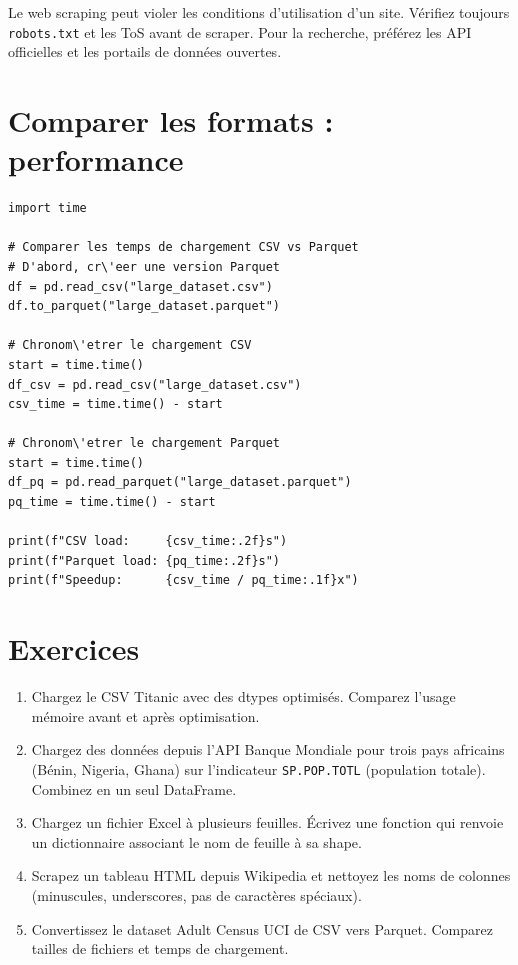 \begin{warningbox}
Le web scraping peut violer les conditions d'utilisation d'un site. V\'erifiez toujours \texttt{robots.txt} et les ToS avant de scraper. Pour la recherche, pr\'ef\'erez les API officielles et les portails de donn\'ees ouvertes.
\end{warningbox}

\section{Comparer les formats : performance}

\begin{verbatim}
import time

# Comparer les temps de chargement CSV vs Parquet
# D'abord, cr\'eer une version Parquet
df = pd.read_csv("large_dataset.csv")
df.to_parquet("large_dataset.parquet")

# Chronom\'etrer le chargement CSV
start = time.time()
df_csv = pd.read_csv("large_dataset.csv")
csv_time = time.time() - start

# Chronom\'etrer le chargement Parquet
start = time.time()
df_pq = pd.read_parquet("large_dataset.parquet")
pq_time = time.time() - start

print(f"CSV load:     {csv_time:.2f}s")
print(f"Parquet load: {pq_time:.2f}s")
print(f"Speedup:      {csv_time / pq_time:.1f}x")
\end{verbatim}

\section{Exercices}

\begin{exercise}
\begin{enumerate}
  \item Chargez le CSV Titanic avec des dtypes optimis\'es. Comparez l'usage m\'emoire avant et apr\`es optimisation.
  \item Chargez des donn\'ees depuis l'API Banque Mondiale pour trois pays africains (B\'enin, Nigeria, Ghana) sur l'indicateur \texttt{SP.POP.TOTL} (population totale). Combinez en un seul DataFrame.
  \item Chargez un fichier Excel \`a plusieurs feuilles. \'Ecrivez une fonction qui renvoie un dictionnaire associant le nom de feuille \`a sa shape.
  \item Scrapez un tableau HTML depuis Wikipedia et nettoyez les noms de colonnes (minuscules, underscores, pas de caract\`eres sp\'eciaux).
  \item Convertissez le dataset Adult Census UCI de CSV vers Parquet. Comparez tailles de fichiers et temps de chargement.
\end{enumerate}
\end{exercise}

